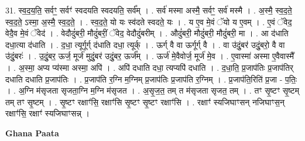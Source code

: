 \documentclass[17pt]{extarticle}
\begin{document}
31. स्व॒द॒य॒ति॒ सर्वꣳ॒॒ सर्वꣳ॑ स्वदयति स्वदयति॒ सर्व᳚म् । . सर्व॑ मस्मा अस्मै॒ सर्वꣳ॒॒ सर्व॑ मस्मै । . अ॒स्मै॒ स्व॒द॒ते॒ स्व॒द॒ते॒ ऽस्मा॒ अ॒स्मै॒ स्व॒द॒ते॒ । . स्व॒द॒ते॒ यो यः स्व॑दते स्वदते॒ यः । . य ए॒व मे॒वं ॅयो य ए॒वम् । . ए॒वं ॅवेद॒ वेदै॒व मे॒वं ॅवेद॑ । . वेदौदुं॑बरी॒ मौदुं॑बरीं॒ ॅवेद॒ वेदौदुं॑बरीम् । . औदुं॑बरी॒ मौदुं॑बरी॒ मौदुं॑बरी॒ मा । . आ द॑धाति दधा॒त्या द॑धाति । . द॒धा॒ त्यूर्गूर्ग् द॑धाति दधा॒ त्यूर्क् । . ऊर्ग् वै वा ऊर्गूर्ग् वै । . वा उ॑दुं॒बर॑ उदुं॒बरो॒ वै वा उ॑दुं॒बरः॑ । . उ॒दुं॒बर॒ ऊर्ज॒ मूर्ज॑ मुदुं॒बर॑ उदुं॒बर॒ ऊर्ज᳚म् । . ऊर्ज॑ मे॒वैवोर्ज॒ मूर्ज॑ मे॒व । . ए॒वास्मा॑ अस्मा ए॒वैवास्मै᳚ । . अ॒स्मा॒ अप्य प्य॑स्मा अस्मा॒ अपि॑ । . अपि॑ दधाति दधा॒ त्यप्यपि॑ दधाति । . द॒धा॒ति॒ प्र॒जाप॑तिः प्र॒जाप॑तिर् दधाति दधाति प्र॒जाप॑तिः । . प्र॒जाप॑ति र॒ग्नि म॒ग्निम् प्र॒जाप॑तिः प्र॒जाप॑ति र॒ग्निम् । . प्र॒जाप॑ति॒रिति॑ प्र॒जा - प॒तिः॒ । . अ॒ग्नि म॑सृजता सृजता॒ग्नि म॒ग्नि म॑सृजत । . अ॒सृ॒ज॒त॒ तम् त म॑सृजता सृजत॒ तम् । . तꣳ सृ॒ष्टꣳ सृ॒ष्टम् तम् तꣳ सृ॒ष्टम् । . सृ॒ष्टꣳ रक्षाꣳ॑सि॒ रक्षाꣳ॑सि सृ॒ष्टꣳ सृ॒ष्टꣳ रक्षाꣳ॑सि । . रक्षाꣳ॑ स्यजिघाꣳसन् नजिघाꣳस॒न् रक्षाꣳ॑सि॒ रक्षाꣳ॑ स्यजिघाꣳसन्न् । \newline

\textbf{Ghana Paata } \newline
\end{document}

